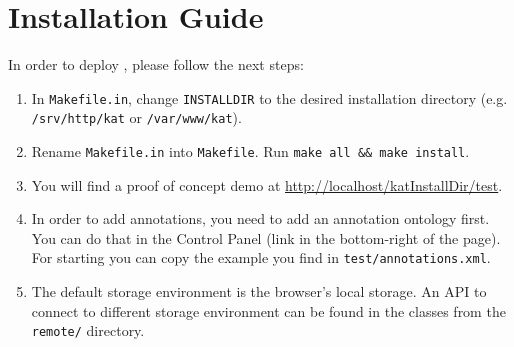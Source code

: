 \section{Installation Guide}

In order to deploy \KAT, please follow the next steps:

\begin{enumerate}
\item In \lstinline|Makefile.in|, change \lstinline|INSTALLDIR| to the desired installation directory
  (e.g. \lstinline|/srv/http/kat| or \lstinline|/var/www/kat|).
\item Rename \lstinline|Makefile.in| into \lstinline|Makefile|. Run \lstinline|make all && make install|.
\item You will find a proof of concept demo at \url{http://localhost/katInstallDir/test}.
\item In order to add annotations, you need to add an annotation ontology first. You can
  do that in the \KAT Control Panel (link in the bottom-right of the page). For starting
  you can copy the example you find in \lstinline|test/annotations.xml|.
\item The default storage environment is the browser's local storage. An API to connect to
  different storage environment can be found in the classes from the \lstinline|remote/|
  directory.
\end{enumerate}


